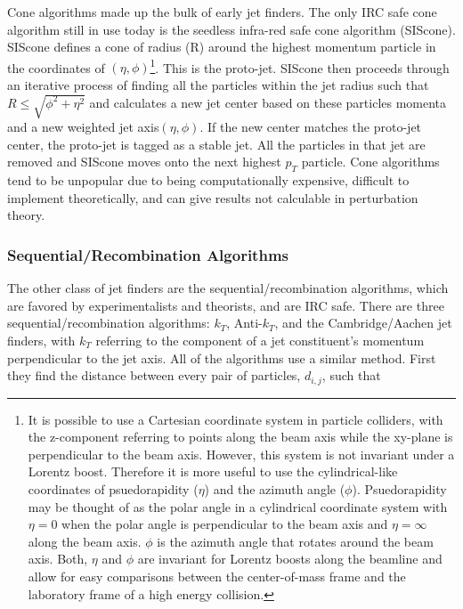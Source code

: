 Cone algorithms made up the bulk of early jet finders.  The only IRC safe cone algorithm still in use today is the seedless infra-red safe cone algorithm (SIScone).  SIScone defines a cone of radius (R) around the highest momentum particle in the coordinates of $(\eta,\phi)$\footnote{It is possible to use a Cartesian coordinate system in particle colliders, with the z-component referring to points along the beam axis while the xy-plane is perpendicular to the beam axis.  However, this system is not invariant under a Lorentz boost.  Therefore it is more useful to use the cylindrical-like coordinates of psuedorapidity ($\eta$) and the azimuth angle ($\phi$). Psuedorapidity may be thought of as the polar angle in a cylindrical coordinate system with $\eta = 0$ when the polar angle is perpendicular to the beam axis and $\eta = \infty$ along the beam axis.  $\phi$ is the azimuth angle that rotates around the beam axis.  Both, $\eta$ and $\phi$ are invariant for Lorentz boosts along the beamline and allow for easy comparisons between the center-of-mass frame and the laboratory frame of a high energy collision.}.  This is the proto-jet.  SIScone then proceeds through an iterative process of finding all the particles within the jet radius such that $R \leq \sqrt{\phi^{2} + \eta^{2}}$ and calculates a new jet center based on these particles momenta and a new weighted jet axis$(\eta,\phi)$.  If the new center matches the proto-jet center, the proto-jet is tagged as a stable jet.  All the particles in that jet are removed and SIScone moves onto the next highest $p_{T}$ particle.  Cone algorithms tend to be unpopular due to being computationally expensive, difficult to implement theoretically, and can give results not calculable in perturbation theory.

\subsubsection{Sequential/Recombination Algorithms}

The other class of jet finders are the sequential/recombination algorithms, which are favored by experimentalists and theorists, and are IRC safe.  There are three sequential/recombination algorithms: $k_{T}$, Anti-$k_{T}$, and the Cambridge/Aachen jet finders, with $k_{T}$ referring to the component of a jet constituent's momentum perpendicular to the jet axis.  All of the algorithms use a similar method.  First they find the distance between every pair of particles, $d_{i,j}$,  such that



